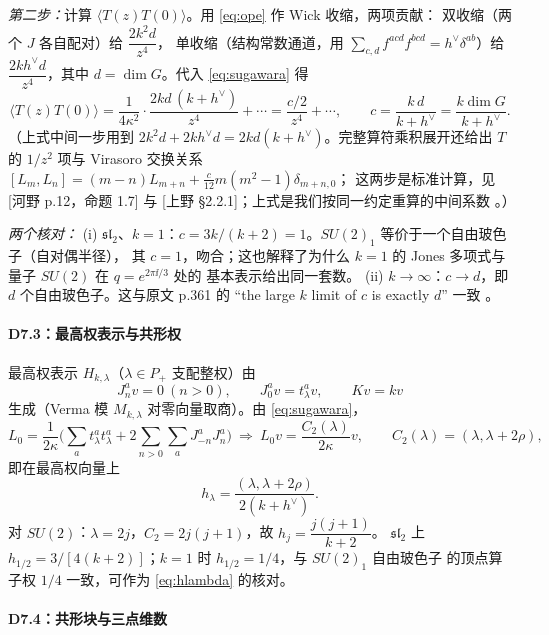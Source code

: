 \emph{第二步：}计算 $\langle T(z)T(0)\rangle$。用 \eqref{eq:ope} 作 Wick 收缩，两项贡献：
双收缩（两个 $J$ 各自配对）给 $\dfrac{2k^2d}{z^4}$，
单收缩（结构常数通道，用 $\sum_{c,d}f^{acd}f^{bcd}=h^\vee\delta^{ab}$）给
$\dfrac{2kh^\vee d}{z^4}$，其中 $d=\dim G$。代入 \eqref{eq:sugawara} 得
\begin{equation}
\langle T(z)T(0)\rangle
=\frac{1}{4\kappa^2}\cdot\frac{2kd\,(k+h^\vee)}{z^4}+\cdots
=\frac{c/2}{z^4}+\cdots,
\qquad
c=\frac{k\,d}{k+h^\vee}=\frac{k\dim G}{k+h^\vee}.
\label{eq:ccentral}
\end{equation}
（上式中间一步用到 $2k^2d+2kh^\vee d=2kd(k+h^\vee)$。完整算符乘积展开还给出 $T$ 的
$1/z^2$ 项与 Virasoro 交换关系 $[L_m,L_n]=(m-n)L_{m+n}+\frac{c}{12}m(m^2-1)\delta_{m+n,0}$；
这两步是标准计算，见 [河野 p.12，命题 1.7] 与 [上野 \S2.2.1]；上式是我们按同一约定重算的中间系数 \ours。）

\emph{两个核对：}
(i) $\mathfrak{sl}_2$、$k=1$：$c=3k/(k+2)=1$。$SU(2)_1$ 等价于一个自由玻色子（自对偶半径），
其 $c=1$，吻合；这也解释了为什么 $k=1$ 的 Jones 多项式与量子 $SU(2)$ 在 $q=e^{2\pi\ii/3}$ 处的
基本表示给出同一套数。
(ii) $k\to\infty$：$c\to d$，即 $d$ 个自由玻色子。这与原文 p.361 的
“the large $k$ limit of $c$ is exactly $d$” 一致 。

\paragraph{D7.3：最高权表示与共形权}

最高权表示 $H_{k,\lambda}$（$\lambda\in P_+$ 支配整权）由
\[
J^a_n v=0\ (n>0),\qquad J^a_0v=t^a_\lambda v,\qquad K v=k v
\]
生成（Verma 模 $M_{k,\lambda}$ 对零向量取商）。由 \eqref{eq:sugawara}，
\begin{equation}
L_0=\frac{1}{2\kappa}\Big(\sum_a t^a_\lambda t^a_\lambda+2\sum_{n>0}\sum_a J^a_{-n}J^a_n\Big)
\ \Longrightarrow\
L_0v=\frac{C_2(\lambda)}{2\kappa}v,
\qquad C_2(\lambda)=(\lambda,\lambda+2\rho),
\end{equation}
即在最高权向量上
\begin{equation}
h_\lambda=\frac{(\lambda,\lambda+2\rho)}{2(k+h^\vee)} .
\label{eq:hlambda}
\end{equation}
对 $SU(2)$：$\lambda=2j$，$C_2=2j(j+1)$，故 $h_j=\dfrac{j(j+1)}{k+2}$。
$\mathfrak{sl}_2$ 上 $h_{1/2}=3/[4(k+2)]$；$k=1$ 时 $h_{1/2}=1/4$，与 $SU(2)_1$ 自由玻色子
的顶点算子权 $1/4$ 一致，可作为 \eqref{eq:hlambda} 的核对。
\ours

\paragraph{D7.4：共形块与三点维数}

